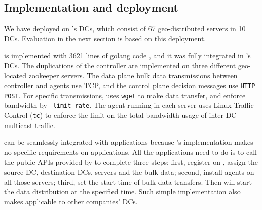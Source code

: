 \subsection{Implementation and deployment}
\label{sec:deployment}


We have deployed \name on \company's DCs, which consist of 67 geo-distributed servers in 10 DCs. Evaluation in the next section is based on this deployment. %

\name is implemented with 3621 lines of golang code \cite{golang}, and it was fully integrated in \company's DCs. The duplications of the controller are implemented on three different geo-located zookeeper servers.
The data plane bulk data transmissions between controller and agents use TCP, and the control plane decision messages use \texttt{HTTP POST}. For specific transmissions, \name uses \texttt{wget} to make data transfer, and enforce bandwidth by \texttt{--limit-rate}.
The agent running in each server uses Linux Traffic Control (\texttt{tc}) to enforce the limit on the total bandwidth usage of inter-DC multicast traffic.



\name can be seamlessly integrated with applications because \name's implementation makes no specific requirements on applications. All the applications need to do is to call the public APIs provided by \name to complete three steps: first, register on \name, assign the source DC, destination DCs, servers and the bulk data; second, install agents on all those servers; third, set the start time of bulk data transfers. Then \name will start the data distribution at the specified time. Such simple implementation also makes \name applicable to other companies' DCs. 	


